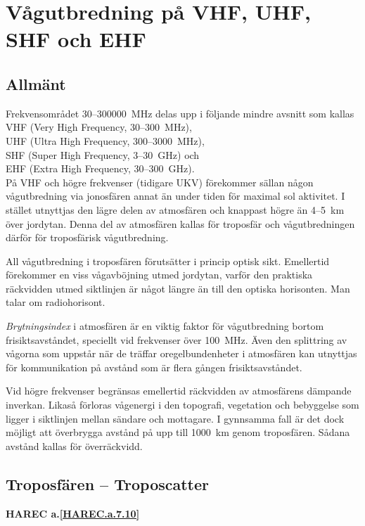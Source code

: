 \section[Vågutbredning på VHF-EHF]{Vågutbredning på VHF, UHF, SHF och EHF}

\subsection{Allmänt}
Frekvensområdet 30--300000~MHz delas upp
i följande mindre avsnitt som kallas \\
VHF (Very High Frequency, 30--300~MHz), \\
UHF (Ultra High Frequency, 300--3000~MHz), \\
SHF (Super High Frequency, 3--30~GHz) och \\
EHF (Extra High Frequency, 30--300~GHz). \\

På VHF och högre frekvenser (tidigare UKV) förekommer sällan någon
vågutbredning via jonosfären annat än under tiden för maximal sol
aktivitet. I stället utnyttjas den lägre delen av atmosfären och
knappast högre än 4--5~km över jordytan. Denna del av atmosfären
kallas för troposfär och vågutbredningen därför för troposfärisk
vågutbredning.

All vågutbredning i troposfären förutsätter i princip optisk
sikt. Emellertid förekommer en viss vågavböjning utmed jordytan,
varför den praktiska räckvidden utmed siktlinjen är något längre än
till den optiska horisonten. Man talar om radiohorisont.

\emph{Brytningsindex} i atmosfären är en viktig faktor för
vågutbredning bortom frisiktsavståndet, speciellt vid frekvenser över
100~MHz. Även den splittring av vågorna som uppstår när de träffar
oregelbundenheter i atmosfären kan utnyttjas för kommunikation på
avstånd som är flera gången frisiktsavståndet.

Vid högre frekvenser begränsas emellertid räckvidden av atmosfärens
dämpande inverkan. Likaså förloras vågenergi i den topografi,
vegetation och bebyggelse som ligger i siktlinjen mellan sändare och
mottagare. I gynnsamma fall är det dock möjligt att överbrygga avstånd
på upp till 1000~km genom troposfären. Sådana avstånd kallas för
överräckvidd.

\subsection{Troposfären -- Troposcatter}
\textbf{
HAREC a.\ref{HAREC.a.7.10}\label{myHAREC.a.7.10}
}

